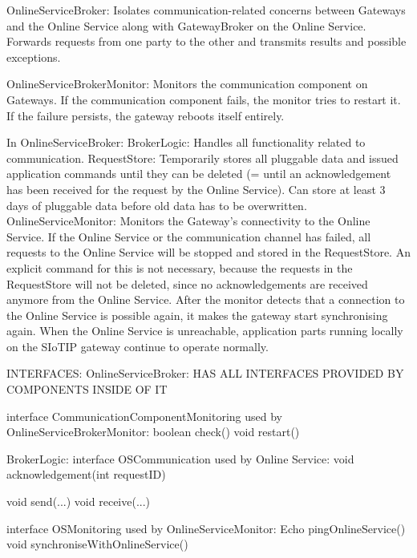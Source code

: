         OnlineServiceBroker: Isolates communication-related concerns between Gateways and the Online Service along with GatewayBroker on the Online Service.
                             Forwards requests from one party to the other and transmits results and possible exceptions.

        OnlineServiceBrokerMonitor: Monitors the communication component on Gateways. If the communication component fails, the monitor
                                    tries to restart it. If the failure persists, the gateway reboots itself entirely.

        In OnlineServiceBroker:
            BrokerLogic: Handles all functionality related to communication.
            RequestStore: Temporarily stores all pluggable data and issued application commands until they can be deleted (= until an acknowledgement has been received for the request by the Online Service). Can store at least 3 days of pluggable data before old data has to be overwritten.
            OnlineServiceMonitor: Monitors the Gateway's connectivity to the Online Service. If the Online Service or the communication channel has failed, all requests to the Online Service will be stopped and stored in the RequestStore. An explicit command for this is not necessary,
                                  because the requests in the RequestStore will not be deleted, since no acknowledgements are received anymore from the Online Service. After the monitor detects that a connection to the Online Service is possible again, it makes the gateway start
                                  synchronising again. When the Online Service is unreachable, application parts running locally on the SIoTIP gateway continue to operate normally.

        INTERFACES:
            OnlineServiceBroker:
                HAS ALL INTERFACES PROVIDED BY COMPONENTS INSIDE OF IT

                interface CommunicationComponentMonitoring used by OnlineServiceBrokerMonitor:
                    boolean check()
                    void restart()

            BrokerLogic:
                interface OSCommunication used by Online Service:
                    void acknowledgement(int requestID)

                    void send(...)
                    void receive(...)

                interface OSMonitoring used by OnlineServiceMonitor:
                    Echo pingOnlineService()
                    void synchroniseWithOnlineService()

